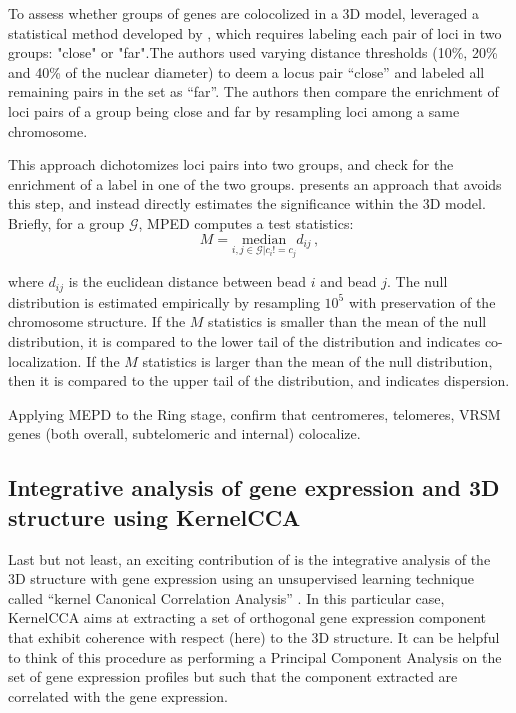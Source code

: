 \documentclass[letterpaper,12pt]{article}
\begin{document}
To assess whether groups of genes are colocolized in a 3D model,
\citet{ay:three-dimensional} leveraged a statistical method developed by
\citet{witten:assessment}, which requires labeling each pair of loci in two
groups: "close" or "far".The authors used varying distance thresholds (10\%,
20\% and 40\% of the nuclear diameter) to deem a locus pair “close” and
labeled all remaining pairs in the set as “far”.  The authors then compare the
enrichment of loci pairs of a group being close and far by resampling loci
among a same chromosome.

This approach dichotomizes loci pairs into two groups, and check for the
enrichment of a label in one of the two groups. \citep{capurso:distance-based}
presents an approach that avoids this step, and instead directly estimates the
significance within the 3D model. Briefly, for a group $\mathcal{G}$, MPED
computes a test statistics:
\begin{equation*}
M = \underset{i,j \in \mathcal{G}| c_i != c_j}{\text{median}} d_{ij}\,,
\end{equation*}

where $d_{ij}$ is the euclidean distance between bead $i$ and bead $j$. The
null distribution is estimated empirically by resampling $10^5$ with
preservation of the chromosome structure. If the $M$ statistics is smaller
than the mean of the null distribution, it is compared to the lower tail of
the distribution and indicates co-localization. If the $M$ statistics is
larger than the mean of the null distribution, then it is compared to the
upper tail of the distribution, and indicates dispersion.

Applying MEPD to the Ring stage, \citet{capurso:distance-based} confirm that
centromeres, telomeres, VRSM genes (both overall, subtelomeric and internal)
colocalize.


\subsection*{Integrative analysis of gene expression and 3D structure using KernelCCA}

Last but not least, an exciting contribution of \citet{ay:three-dimensional}
is the integrative analysis of the 3D structure with gene expression using an
unsupervised learning technique called ``kernel Canonical Correlation
Analysis'' \citep{bach:kernel}. In this particular case,  KernelCCA aims at
extracting a set of orthogonal gene expression component that exhibit
coherence with respect (here) to the 3D structure. It can be helpful to
think of this procedure as performing a Principal Component Analysis on the
set of gene expression profiles but such that the component extracted are
correlated with the gene expression.
\end{document}
